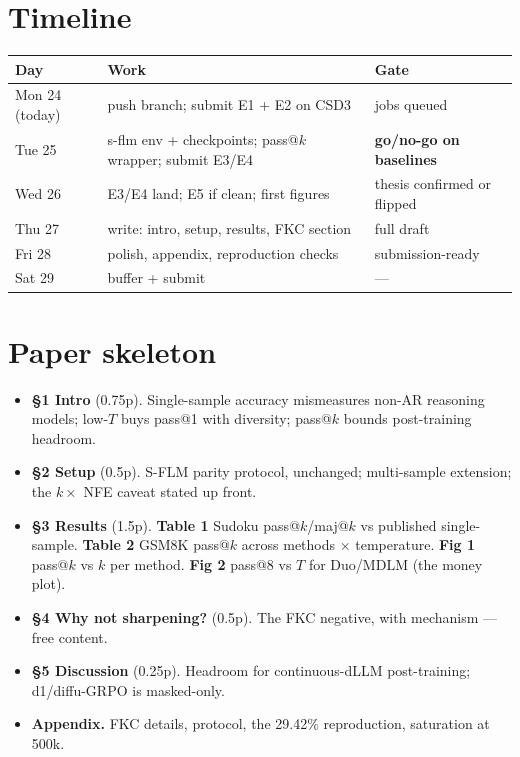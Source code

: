 \documentclass[11pt,a4paper]{article}
\begin{document}
\section{Timeline}

\begin{center}\small
\begin{tabular}{@{}lll@{}}
\toprule
Day & Work & Gate \\ \midrule
Mon 24 (today) & push branch; submit E1 + E2 on CSD3 & jobs queued \\
Tue 25 & s-flm env + checkpoints; pass@$k$ wrapper; submit E3/E4 & \textbf{go/no-go on baselines} \\
Wed 26 & E3/E4 land; E5 if clean; first figures & thesis confirmed or flipped \\
Thu 27 & write: intro, setup, results, FKC section & full draft \\
Fri 28 & polish, appendix, reproduction checks & submission-ready \\
Sat 29 & buffer + submit & --- \\
\bottomrule
\end{tabular}
\end{center}

\section{Paper skeleton}

\begin{itemize}
\item \textbf{\S1 Intro} (0.75p). Single-sample accuracy mismeasures non-AR reasoning models;
      low-$T$ buys pass@1 with diversity; pass@$k$ bounds post-training headroom.
\item \textbf{\S2 Setup} (0.5p). S-FLM parity protocol, unchanged; multi-sample extension; the
      $k\times$ NFE caveat stated up front.
\item \textbf{\S3 Results} (1.5p). \textbf{Table 1} Sudoku pass@$k$/maj@$k$ vs published single-sample.
      \textbf{Table 2} GSM8K pass@$k$ across methods $\times$ temperature.
      \textbf{Fig 1} pass@$k$ vs $k$ per method. \textbf{Fig 2} pass@8 vs $T$ for Duo/MDLM (the money plot).
\item \textbf{\S4 Why not sharpening?} (0.5p). The FKC negative, with mechanism --- free content.
\item \textbf{\S5 Discussion} (0.25p). Headroom for continuous-dLLM post-training; d1/diffu-GRPO is masked-only.
\item \textbf{Appendix.} FKC details, protocol, the 29.42\% reproduction, saturation at 500k.
\end{itemize}
\end{document}
